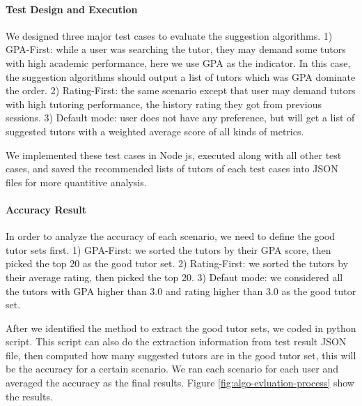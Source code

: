 \paragraph{Test Design and Execution} 
We designed three major test cases to evaluate the suggestion algorithms. 1) GPA-First: while a user was searching the tutor, they may demand some tutors with high academic performance, here we use GPA as the indicator. In this case, the suggestion algorithms should output a list of tutors which was GPA dominate the order. 2) Rating-First: the same scenario except that user may demand tutors with high tutoring performance, the history rating they got from previous sessions. 3) Default mode: user does not have any preference, but will get a list of suggested tutors with a weighted average score of all kinds of metrics.

We implemented these test cases in Node js, executed along with all other test cases, and saved the recommended lists of tutors of each test cases into JSON files for more quantitive analysis.

\paragraph{Accuracy Result} 
In order to analyze the accuracy of each scenario, we need to define the good tutor sets first. 1) GPA-First: we sorted the tutors by their GPA score, then picked the top 20 as the good tutor set. 2) Rating-First: we sorted the tutors by their average rating, then picked the top 20. 3) Defaut mode: we considered all the tutors with GPA higher than 3.0 and rating higher than 3.0 as the good tutor set.

After we identified the method to extract the good tutor sets, we coded in python script. This script can also do the extraction information from test result JSON file, then computed how many suggested tutors are in the good tutor set, this will be the accuracy for a certain scenario. We ran each scenario for each user and averaged the accuracy as the final results. Figure \ref{fig:algo-evluation-process} show the results.


